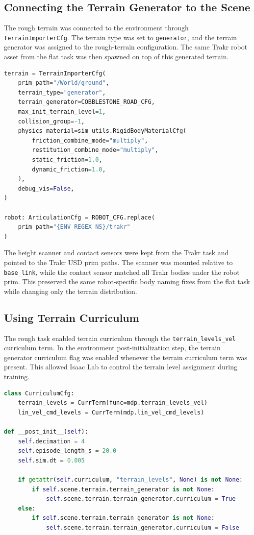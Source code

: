 \subsection{Connecting the Terrain Generator to the Scene}

The rough terrain was connected to the environment through \texttt{TerrainImporterCfg}. The terrain type
was set to \texttt{generator}, and the terrain generator was assigned to the rough-terrain configuration.
The same Trakr robot asset from the flat task was then spawned on top of this generated terrain.

\begin{lstlisting}[language=Python,caption={Scene terrain importer for generated rough terrain.}]
terrain = TerrainImporterCfg(
    prim_path="/World/ground",
    terrain_type="generator",
    terrain_generator=COBBLESTONE_ROAD_CFG,
    max_init_terrain_level=1,
    collision_group=-1,
    physics_material=sim_utils.RigidBodyMaterialCfg(
        friction_combine_mode="multiply",
        restitution_combine_mode="multiply",
        static_friction=1.0,
        dynamic_friction=1.0,
    ),
    debug_vis=False,
)

robot: ArticulationCfg = ROBOT_CFG.replace(
    prim_path="{ENV_REGEX_NS}/trakr"
)
\end{lstlisting}

The height scanner and contact sensors were kept from the Trakr task and pointed to the Trakr USD prim
paths. The scanner was mounted relative to \texttt{base\_link}, while the contact sensor matched all Trakr
bodies under the robot prim. This preserved the same robot-specific body naming fixes from the flat task
while changing only the terrain distribution.

\subsection{Using Terrain Curriculum}

The rough task enabled terrain curriculum through the \texttt{terrain\_levels\_vel} curriculum term. In
the environment post-initialization step, the terrain generator curriculum flag was enabled whenever the
terrain curriculum term was present. This allowed Isaac Lab to control the terrain level assignment during
training.

\begin{lstlisting}[language=Python,caption={Enabling terrain curriculum for the rough generator.}]
class CurriculumCfg:
    terrain_levels = CurrTerm(func=mdp.terrain_levels_vel)
    lin_vel_cmd_levels = CurrTerm(mdp.lin_vel_cmd_levels)

def __post_init__(self):
    self.decimation = 4
    self.episode_length_s = 20.0
    self.sim.dt = 0.005

    if getattr(self.curriculum, "terrain_levels", None) is not None:
        if self.scene.terrain.terrain_generator is not None:
            self.scene.terrain.terrain_generator.curriculum = True
    else:
        if self.scene.terrain.terrain_generator is not None:
            self.scene.terrain.terrain_generator.curriculum = False
\end{lstlisting}

